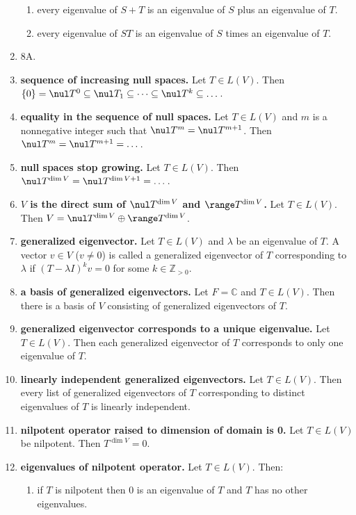 \begin{enumerate}
	\begin{enumerate}
		\item every eigenvalue of $S+T$ is an eigenvalue of $S$ plus an eigenvalue of $T$. 
		\item every eigenvalue of $ST$ is an eigenvalue of $S$ times an eigenvalue of $T$. 
	\end{enumerate}
	\item 8A. 
	\item \textbf{sequence of increasing null spaces. } Let $T \in L(V)$. Then $\{0\} = \nul T^0 \subseteq \nul T_1 \subseteq \dots \subseteq \nul T^k \subseteq \dots$. 
	\item \textbf{equality in the sequence of null spaces. } Let $T \in L(V)$ and $m$ is a nonnegative integer such that $\nul T^m = \nul T^{m+1}$. Then $\nul T^m = \nul T^{m+1} = \dots $. 
	\item \textbf{null spaces stop growing. } Let $T \in L(V)$. Then $\nul T^{\dim V} = \nul T^{\dim V +1} = \dots$. 
	\item \textbf{$V$ is the direct sum of $\nul T^{\dim V}$ and $\range T^{\dim V}$. } Let $T \in L(V)$. Then $V = \nul T^{\dim V} \oplus \range T^{\dim V}$. 
	\item \textbf{generalized eigenvector. } Let $T \in L(V)$ and $\lambda$ be an eigenvalue of $T$. A vector $v \in V$ ($v \neq 0$) is called a generalized eigenvector of $T$ corresponding to $\lambda$ if $(T - \lambda I)^k v = 0$ for some $k \in \mathbb{Z}_{>0}$. 
	\item \textbf{a basis of generalized eigenvectors. } Let $F = \mathbb{C}$ and $T \in L(V)$. Then there is a basis of $V$ consisting of generalized eigenvectors of $T$. 
	\item \textbf{generalized eigenvector corresponds to a unique eigenvalue. } Let $T \in L(V)$. Then each generalized eigenvector of $T$ corresponds to only one eigenvalue of $T$. 
	\item \textbf{linearly independent generalized eigenvectors. } Let $T \in L(V)$. Then every list of generalized eigenvectors of $T$ corresponding to distinct eigenvalues of $T$ is linearly independent. 
	\item \textbf{nilpotent operator raised to dimension of domain is 0. } Let $T \in L(V)$ be nilpotent. Then $T^{\dim V} = 0$. 
	\item \textbf{eigenvalues of nilpotent operator. } Let $T \in L(V)$. Then: 
	\begin{enumerate}
		\item if $T$ is nilpotent then 0 is an eigenvalue of $T$ and $T$ has no other eigenvalues. 

\end{enumerate}
\end{enumerate}
